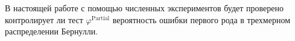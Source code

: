 В настоящей работе с помощью численных экспериментов
будет проверено контролирует ли тест 
$\varphi^{\text{Partial}}$ вероятность ошибки первого рода
в трехмерном распределении Бернулли.


